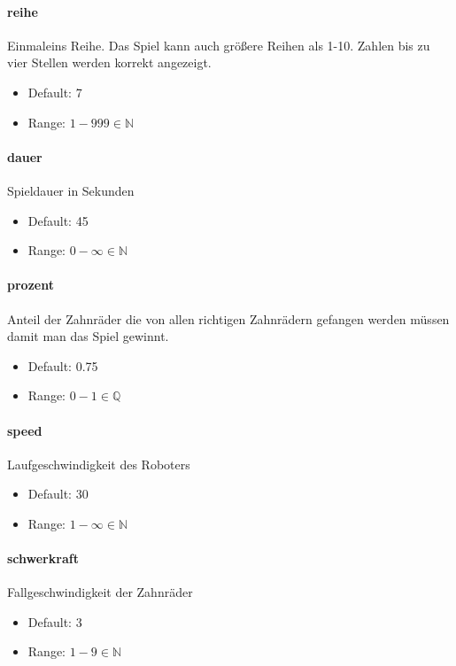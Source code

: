 \documentclass[]{article}
\begin{document}
\begin{multicols}{2}

	\paragraph{reihe}  Einmaleins Reihe. Das Spiel kann auch größere Reihen als 1-10. Zahlen bis zu vier Stellen werden korrekt angezeigt.
	\begin{itemize}
		\item Default: 7
		\item Range: $1-999 \in \mathbb{N} $
	\end{itemize}

	\paragraph{dauer}  Spieldauer in Sekunden
	\begin{itemize}
		\item Default: 45
		\item Range: $ 0 - \infty \in \mathbb{N}$
	\end{itemize}
	\paragraph{prozent} Anteil der Zahnräder die von allen richtigen Zahnrädern gefangen werden müssen damit man das Spiel gewinnt.
	\begin{itemize}
		\item Default: 0.75
		\item Range: $ 0 - 1 \in \mathbb{Q}$
	\end{itemize}
	\paragraph{speed}  Laufgeschwindigkeit des Roboters
	\begin{itemize}
		\item Default: 30
		\item Range: $ 1 - \infty \in \mathbb{N}$
	\end{itemize}
	\paragraph{schwerkraft}  Fallgeschwindigkeit der Zahnräder
	\begin{itemize}
		\item Default: 3
		\item Range: $ \displaystyle 1 - 9 \in \mathbb{N}$
	\end{itemize}

\end{multicols}
\end{document}
